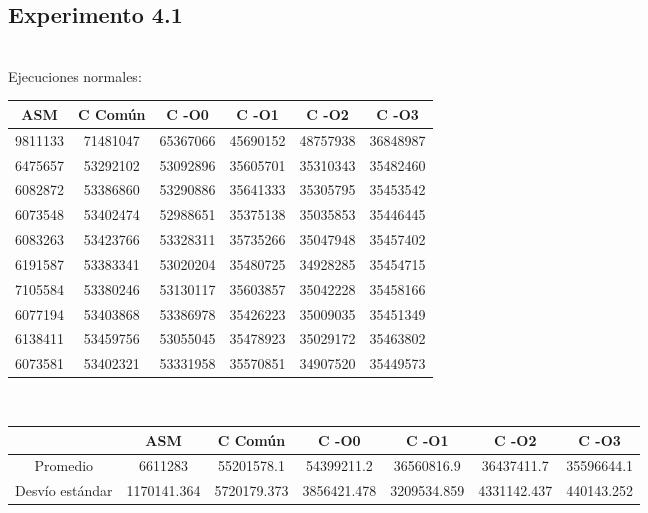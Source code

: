﻿\documentclass[a4paper]{article}
\begin{document}
\subsection{Experimento 4.1}
\ \\
Ejecuciones normales:
\ \\
\begin{center}
  \begin{tabular}{| c | c | c | c | c | c |}
    \hline
    ASM & C Com\'un &C -O0 & C -O1 & C -O2 & C -O3\\ 
    \hline\hline
	9811133	&71481047	&65367066	&45690152	&48757938	&36848987 \\
	\hline                                                 
  6475657 & 53292102 & 53092896 & 35605701 & 35310343  &35482460\\
  \hline  
  6082872 & 53386860 & 53290886 & 35641333 & 35305795  &35453542\\
  \hline  
  6073548 & 53402474 & 52988651 & 35375138 & 35035853  &35446445\\
  \hline  
  6083263 & 53423766 & 53328311 & 35735266 & 35047948  &35457402\\
  \hline  
  6191587 & 53383341 & 53020204 & 35480725 & 34928285  &35454715\\
  \hline  
  7105584 & 53380246 & 53130117 & 35603857 & 35042228 & 35458166\\
  \hline  
  6077194 & 53403868 & 53386978 & 35426223 & 35009035 & 35451349\\
  \hline  
  6138411 & 53459756 & 53055045 & 35478923 & 35029172 & 35463802\\
  \hline  
  6073581 & 53402321 & 53331958 & 35570851 & 34907520 & 35449573\\
	\hline
  \end{tabular}
\end{center}
\ \\
\begin{center}
  \begin{tabular}{| c | c | c | c | c | c | c |}
    \hline
      & ASM & C Com\'un& C -O0 & C -O1 & C -O2 & C -O3 \\
      \hline\hline
      Promedio  & 6611283& 55201578.1&  54399211.2 & 36560816.9  &36437411.7  &35596644.1\\
      \hline
      Desvío estándar & 1170141.364 &5720179.373 & 3856421.478&  3209534.859 & 4331142.437 & 440143.252\\
      \hline
  \end{tabular}
\end{center}
\end{document}
